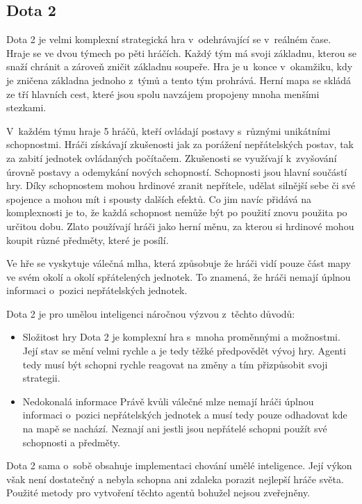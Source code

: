 \subsection{Dota 2}\label{subsec:dota}
Dota 2 je velmi komplexní strategická hra v~odehrávající se v~reálném čase.
Hraje se ve dvou týmech po pěti hráčích.
Každý tým má svoji základnu, kterou se snaží chránit a zároveň zničit základnu soupeře.
Hra je u~konce v~okamžiku, kdy je zničena základna jednoho z~týmů a tento tým prohrává.
Herní mapa se skládá ze tří hlavních cest, které jsou spolu navzájem propojeny mnoha menšími stezkami.

V~každém týmu hraje 5 hráčů, kteří ovládají postavy s~různými unikátními schopnostmi.
Hráči získávají zkušenosti jak za porážení nepřátelských postav, tak za zabití jednotek ovládaných počítačem.
Zkušenosti se využívají k~zvyšování úrovně postavy a odemykání nových schopností.
Schopnosti jsou hlavní součástí hry.
Díky schopnostem mohou hrdinové zranit nepřítele, udělat silnější sebe či své spojence a mohou mít i spousty dalších efektů.
Co jim navíc přidává na komplexnosti je to, že každá schopnost nemůže být po použití znovu použita po určitou dobu.
Zlato používají hráči jako herní měnu, za kterou si hrdinové mohou koupit různé předměty, které je posílí.

Ve hře se vyskytuje válečná mlha, která způsobuje že hráči vidí pouze část mapy ve svém okolí a okolí spřátelených jednotek.
To znamená, že hráči nemají úplnou informaci o~pozici nepřátelských jednotek.

\bigskip

Dota 2 je pro umělou inteligenci náročnou výzvou z~těchto důvodů:
\begin{itemize}
  \item Složitost hry
  Dota 2 je komplexní hra s~mnoha proměnnými a možnostmi.
  Její stav se mění velmi rychle a je tedy těžké předpovědět vývoj hry.
  Agenti tedy musí být schopni rychle reagovat na změny a tím přizpůsobit svoji strategii.
  \item Nedokonalá informace
  Právě kvůli válečné mlze nemají hráči úplnou informaci o~pozici nepřátelských jednotek a musí tedy pouze odhadovat kde na mapě se nachází.
  Neznají ani jestli jsou nepřátelé schopni použít své schopnosti a předměty.
\end{itemize}

Dota 2 sama o~sobě obsahuje implementaci chování umělé inteligence.
Její výkon však není dostatečný a nebyla schopna ani zdaleka porazit nejlepší hráče světa.
Použité metody pro vytvoření těchto agentů bohužel nejsou zveřejněny.

